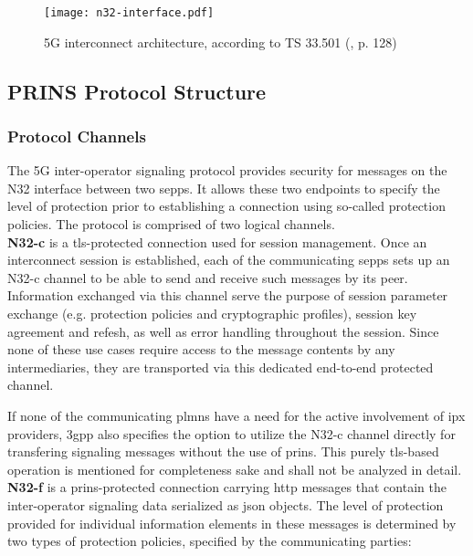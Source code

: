 \begin{figure}[ht!]
    \texttt{[image: n32-interface.pdf]}
    \centering
    \caption{5G interconnect architecture, according to TS 33.501 (\cite{3gpp.33.501}, p. 128)}
    \label{fig:n32}
\end{figure}

\subsection{PRINS Protocol Structure}
\subsubsection{Protocol Channels}

The 5G inter-operator signaling protocol provides security for messages on the N32 interface between two \glspl{sepp}.
It allows these two endpoints to specify the level of protection prior to establishing a connection using so-called protection policies.
The protocol is comprised of two logical channels.
\\

\textbf{N32-c} is a \gls{tls}-protected connection used for session management.
Once an interconnect session is established, each of the communicating \glspl{sepp} sets up an N32-c channel to be able to send and receive such messages by its peer.
Information exchanged via this channel serve the purpose of session parameter exchange (e.g. protection policies and cryptographic profiles), session key agreement and refesh, as well as error handling throughout the session.
Since none of these use cases require access to the message contents by any intermediaries, they are transported via this dedicated end-to-end protected channel.

If none of the communicating \glspl{plmn} have a need for the active involvement of \gls{ipx} providers, \gls{3gpp} also specifies the option to utilize the N32-c channel directly for transfering signaling messages without the use of \gls{prins}.
This purely \gls{tls}-based operation is mentioned for completeness sake and shall not be analyzed in detail.
\\

\textbf{N32-f} is a \gls{prins}-protected connection carrying \gls{http} messages that contain the inter-operator signaling data serialized as \gls{json} objects.
The level of protection provided for individual information elements in these messages is determined by two types of protection policies, specified by the communicating parties:


